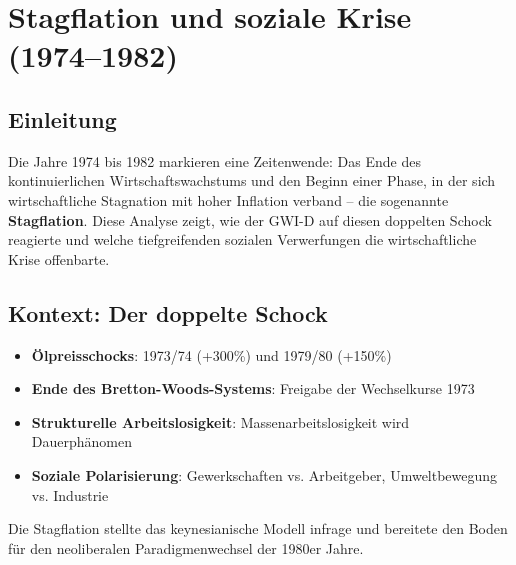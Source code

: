 \chapter{Stagflation und soziale Krise (1974–1982)}
\label{chap:stagflation}

\section*{Einleitung}
Die Jahre 1974 bis 1982 markieren eine Zeitenwende: Das Ende des kontinuierlichen Wirtschaftswachstums und den Beginn einer Phase, in der sich wirtschaftliche Stagnation mit hoher Inflation verband – die sogenannte \textbf{Stagflation}. Diese Analyse zeigt, wie der GWI-D auf diesen doppelten Schock reagierte und welche tiefgreifenden sozialen Verwerfungen die wirtschaftliche Krise offenbarte.

\section{Kontext: Der doppelte Schock}

\begin{itemize}
    \item \textbf{Ölpreisschocks}: 1973/74 (+300\%) und 1979/80 (+150\%) 
    \item \textbf{Ende des Bretton-Woods-Systems}: Freigabe der Wechselkurse 1973
    \item \textbf{Strukturelle Arbeitslosigkeit}: Massenarbeitslosigkeit wird Dauerphänomen
    \item \textbf{Soziale Polarisierung}: Gewerkschaften vs. Arbeitgeber, Umweltbewegung vs. Industrie
\end{itemize}

Die Stagflation stellte das keynesianische Modell infrage und bereitete den Boden für den neoliberalen Paradigmenwechsel der 1980er Jahre.


